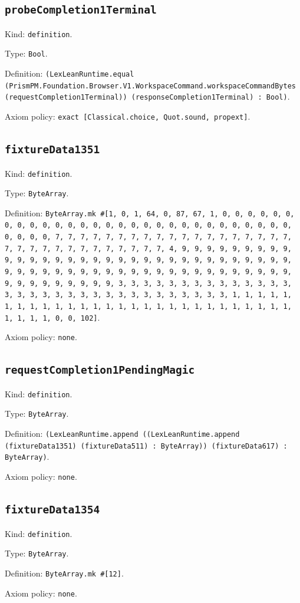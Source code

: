 \documentclass[11pt]{article}
\begin{document}
\subsection*{\texttt{probeCompletion1Terminal}}
\noindent Kind: \texttt{definition}.\par
\noindent Type: \texttt{Bool}.\par
\noindent Definition: \texttt{(LexLeanRuntime.equal (PrismPM.Foundation.Browser.V1.WorkspaceCommand.workspaceCommandBytes (requestCompletion1Terminal)) (responseCompletion1Terminal) : Bool)}.\par
\noindent Axiom policy: \texttt{exact [Classical.choice, Quot.sound, propext]}.\par
\subsection*{\texttt{fixtureData1351}}
\noindent Kind: \texttt{definition}.\par
\noindent Type: \texttt{ByteArray}.\par
\noindent Definition: \texttt{ByteArray.mk \#[1, 0, 1, 64, 0, 87, 67, 1, 0, 0, 0, 0, 0, 0, 0, 0, 0, 0, 0, 0, 0, 0, 0, 0, 0, 0, 0, 0, 0, 0, 0, 0, 0, 0, 0, 0, 0, 0, 0, 0, 0, 7, 7, 7, 7, 7, 7, 7, 7, 7, 7, 7, 7, 7, 7, 7, 7, 7, 7, 7, 7, 7, 7, 7, 7, 7, 7, 7, 7, 7, 7, 7, 7, 4, 9, 9, 9, 9, 9, 9, 9, 9, 9, 9, 9, 9, 9, 9, 9, 9, 9, 9, 9, 9, 9, 9, 9, 9, 9, 9, 9, 9, 9, 9, 9, 9, 9, 9, 9, 9, 9, 9, 9, 9, 9, 9, 9, 9, 9, 9, 9, 9, 9, 9, 9, 9, 9, 9, 9, 9, 9, 9, 9, 9, 9, 9, 9, 9, 3, 3, 3, 3, 3, 3, 3, 3, 3, 3, 3, 3, 3, 3, 3, 3, 3, 3, 3, 3, 3, 3, 3, 3, 3, 3, 3, 3, 3, 3, 3, 3, 1, 1, 1, 1, 1, 1, 1, 1, 1, 1, 1, 1, 1, 1, 1, 1, 1, 1, 1, 1, 1, 1, 1, 1, 1, 1, 1, 1, 1, 1, 1, 1, 0, 0, 102]}.\par
\noindent Axiom policy: \texttt{none}.\par
\subsection*{\texttt{requestCompletion1PendingMagic}}
\noindent Kind: \texttt{definition}.\par
\noindent Type: \texttt{ByteArray}.\par
\noindent Definition: \texttt{(LexLeanRuntime.append ((LexLeanRuntime.append (fixtureData1351) (fixtureData511) : ByteArray)) (fixtureData617) : ByteArray)}.\par
\noindent Axiom policy: \texttt{none}.\par
\subsection*{\texttt{fixtureData1354}}
\noindent Kind: \texttt{definition}.\par
\noindent Type: \texttt{ByteArray}.\par
\noindent Definition: \texttt{ByteArray.mk \#[12]}.\par
\noindent Axiom policy: \texttt{none}.\par
\end{document}
